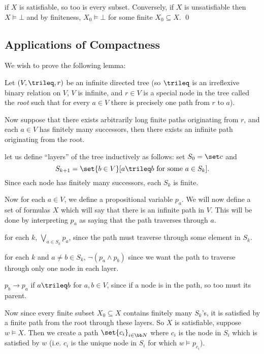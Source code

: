 \ethrm

\Proof if $X$ is satisfiable, so too is every subset.
Conversely, if $X$ is unsatisfiable then $X\vDash\bot$ and by finiteness, $X_0\vDash\bot$ for some
finite $X_0\subseteq X$.
\qed

\subsection{Applications of Compactness}

We wish to prove the following lemma:

\blemm[title=K\"onig's Tree Lemma]

    Let $(V,\trileq,r)$ be an infinite directed tree (so $\trileq$ is an irreflexive binary
    relation on $V$, $V$ is infinite, and $r\in V$ is a special node in the tree called the
    {\it root} such that for every $a\in V$ there is precisely one path from $r$ to $a$).

    Now suppose that there exists arbitrarily long finite paths originating from $r$, and each
    $a\in V$ has finitely many successors, then there exists an infinite path originating from
    the root.

\elemm

\Proof let us define ``layers'' of the tree inductively as follows: set $S_0=\set c$ and
$$ S_{k+1}=\set{b\in V}[a\trileq b\hbox{ for some $a\in S_k$}] . $$
Since each node has finitely many successors, each $S_k$ is finite.

Now for each $a\in V$, we define a propositional variable $p_a$.
We will now define a set of formulas $X$ which will say that there is an infinite path in $V$.
This will be done by interpreting $p_a$ as saying that the path traverses through $a$.

\benum
    \item for each $k$, $\bigvee_{a\in S_k}p_a$, since the path must traverse through some element
    in $S_k$.
    \item for each $k$ and $a\neq b\in S_k$, $\neg(p_a\land p_b)$ since we want the path to
    traverse through only one node in each layer.
    \item $p_b\to p_a$ if $a\trileq b$ for $a,b\in V$, since if a node is in the path, so too
    must its parent.
\eenum

Now since every finite subset $X_0\subseteq X$ contains finitely many $S_k$'s, it is satisfied by
a finite path from the root through these layers.
So $X$ is satisfiable, suppose $w\vDash X$.
Then we create a path $\set{c_i}_{i\in{\bb N}}$ where $c_i$ is the node in $S_i$ which is
satisfied by $w$ (i.e. $c_i$ is the unique node in $S_i$ for which $w\vDash p_{c_i}$).

